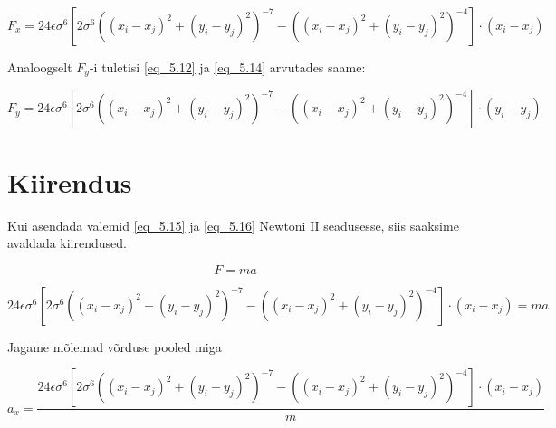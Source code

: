 \begin{flushleft}
\begin{equation} \label{eq_5.15}
F_{x}=24 \epsilon \sigma^{6} [2\sigma^{6}((x_{i} -x_{j})^{2}+(y_{i}-y_{j})^{2})^{-7}-((x_{i}-x_{j})^{2}+(y_{i}-y_{j})^{2}) ^{-4}] \cdot (x_{i}-x_{j}) 
\end{equation}

Analoogselt $F_{y}$-i tuletisi \ref{eq_5.12} ja \ref{eq_5.14} arvutades saame:

\begin{equation} \label{eq_5.16}
F_{y}=24 \epsilon \sigma^{6} [2\sigma^{6}((x_{i} -x_{j})^{2}+(y_{i}-y_{j})^{2})^{-7}-((x_{i}-x_{j})^{2}+(y_{i}-y_{j})^{2}) ^{-4}] \cdot (y_{i}-y_{j})
\end{equation}

\section{Kiirendus}

Kui asendada valemid \ref{eq_5.15} ja \ref{eq_5.16} Newtoni II seadusesse, siis saaksime avaldada kiirendused.

\begin{equation} \label{eq_5.17}
F=ma
\end{equation}

\begin{equation} \label{eq_5.18}
24 \epsilon \sigma^{6} [2\sigma^{6}((x_{i} -x_{j})^{2}+(y_{i}-y_{j})^{2})^{-7}-((x_{i}-x_{j})^{2}+(y_{i}-y_{j})^{2}) ^{-4}] \cdot (x_{i}-x_{j})=ma
\end{equation}

Jagame mõlemad võrduse pooled miga

\begin{equation} \label{eq_5.19}
a_{x}=\dfrac{24 \epsilon \sigma^{6} [2\sigma^{6}((x_{i} -x_{j})^{2}+(y_{i}-y_{j})^{2})^{-7}-((x_{i}-x_{j})^{2}+(y_{i}-y_{j})^{2}) ^{-4}] \cdot (x_{i}-x_{j})}{m}

\end{equation}

\end{flushleft}